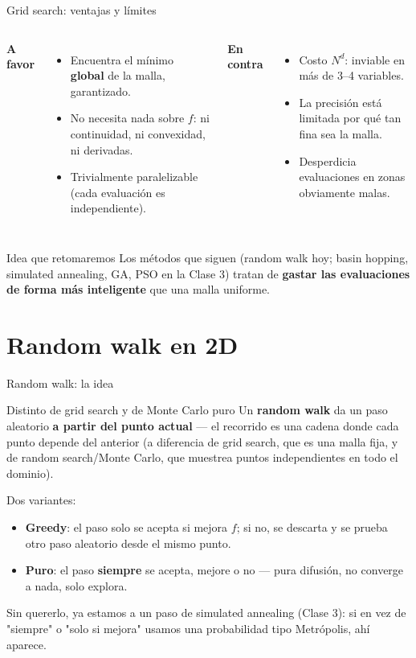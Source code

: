 \documentclass[aspectratio=169,10pt]{beamer}
\begin{document}
\begin{frame}{Grid search: ventajas y límites}
  \begin{columns}
    \textbf{A favor}
    \begin{itemize}
      \item Encuentra el mínimo \textbf{global} de la malla, garantizado.
      \item No necesita nada sobre $f$: ni continuidad, ni convexidad,
        ni derivadas.
      \item Trivialmente paralelizable (cada evaluación es independiente).
    \end{itemize}
    \textbf{En contra}
    \begin{itemize}
      \item Costo $N^d$: inviable en más de 3--4 variables.
      \item La precisión está limitada por qué tan fina sea la malla.
      \item Desperdicia evaluaciones en zonas obviamente malas.
    \end{itemize}
  \end{columns}
  \vspace{0.3cm}
  \begin{alertblock}{Idea que retomaremos}
    Los métodos que siguen (random walk hoy; basin hopping, simulated
    annealing, GA, PSO en la Clase 3) tratan de \textbf{gastar las
    evaluaciones de forma más inteligente} que una malla uniforme.
  \end{alertblock}
\end{frame}

\section{Random walk en 2D}

\begin{frame}{Random walk: la idea}
  \begin{block}{Distinto de grid search y de Monte Carlo puro}
    Un \textbf{random walk} da un paso aleatorio \textbf{a partir del
    punto actual} — el recorrido es una cadena donde cada punto depende
    del anterior (a diferencia de grid search, que es una malla fija, y
    de random search/Monte Carlo, que muestrea puntos independientes en
    todo el dominio).
  \end{block}
  Dos variantes:
  \begin{itemize}
    \item \textbf{Greedy}: el paso solo se acepta si mejora $f$; si no,
      se descarta y se prueba otro paso aleatorio desde el mismo punto.
    \item \textbf{Puro}: el paso \textbf{siempre} se acepta, mejore o no
      — pura difusión, no converge a nada, solo explora.
  \end{itemize}
  \small Sin quererlo, ya estamos a un paso de simulated annealing
  (Clase 3): si en vez de "siempre" o "solo si mejora" usamos una
  probabilidad tipo Metrópolis, ahí aparece.
\end{frame}
\end{document}
